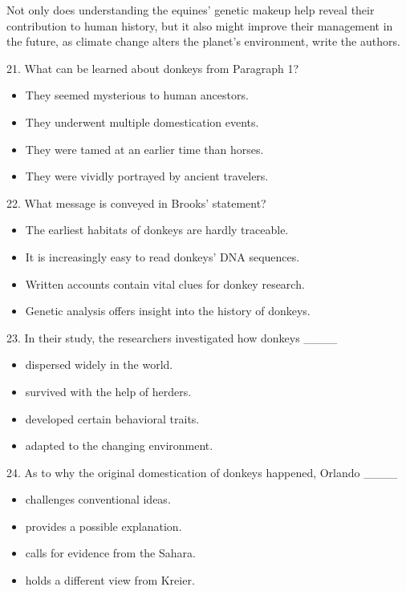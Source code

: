 \documentclass[UTF8,11pt]{ctexart}
\begin{document}
Not only does understanding the equines’ genetic makeup help reveal their contribution to human history, but it also might improve their management in the future, as climate change alters the planet’s environment, write the authors.


21. What can be learned about donkeys from Paragraph 1?


\begin{itemize}[leftmargin=2em,itemsep=.2em,topsep=.4em]\item[A.] They seemed mysterious to human ancestors.
\item[B.] They underwent multiple domestication events.
\item[C.] They were tamed at an earlier time than horses.
\item[D.] They were vividly portrayed by ancient travelers.
\end{itemize}

22. What message is conveyed in Brooks’ statement?


\begin{itemize}[leftmargin=2em,itemsep=.2em,topsep=.4em]\item[A.] The earliest habitats of donkeys are hardly traceable.
\item[B.] It is increasingly easy to read donkeys’ DNA sequences.
\item[C.] Written accounts contain vital clues for donkey research.
\item[D.] Genetic analysis offers insight into the history of donkeys.
\end{itemize}

23. In their study, the researchers investigated how donkeys \_\_\_\_


\begin{itemize}[leftmargin=2em,itemsep=.2em,topsep=.4em]\item[A.] dispersed widely in the world.
\item[B.] survived with the help of herders.
\item[C.] developed certain behavioral traits.
\item[D.] adapted to the changing environment.
\end{itemize}

24. As to why the original domestication of donkeys happened, Orlando \_\_\_\_


\begin{itemize}[leftmargin=2em,itemsep=.2em,topsep=.4em]\item[A.] challenges conventional ideas.
\item[B.] provides a possible explanation.
\item[C.] calls for evidence from the Sahara.
\item[D.] holds a different view from Kreier.
\end{itemize}
\end{document}
